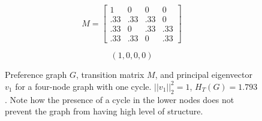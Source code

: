 \begin{figure}[!htb] %
\centering
\begin{minipage}{1.2in}
\end{minipage}
\hfill
\begin{minipage}{1.2in}
\[
M=
  \begin{bmatrix}
    1 & 0 & 0 & 0 \\
    .33 & .33 & .33 & 0 \\
    .33 & 0 & .33 & .33 \\
    .33 & .33 & 0 & .33
  \end{bmatrix}
\]
\end{minipage}
\hfill
\begin{minipage}{1.2in}
\[
(1, 0, 0, 0)
\]
\end{minipage}
\caption{Preference graph $G$, transition matrix $M$, and principal eigenvector $v_1$ for a four-node graph with one cycle. $||v_1||_2^2 = 1$, $H_T(G) = 1.793$. Note how the presence of a cycle in the lower nodes does not prevent the graph from having high level of structure.}
\label{fig:linalg_9} 
\end{figure}